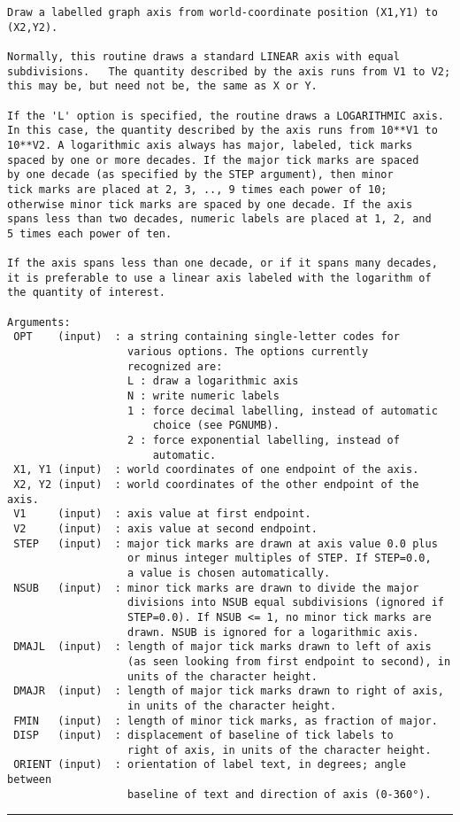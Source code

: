 {\begin{verbatim}
Draw a labelled graph axis from world-coordinate position (X1,Y1) to
(X2,Y2).

Normally, this routine draws a standard LINEAR axis with equal
subdivisions.   The quantity described by the axis runs from V1 to V2;
this may be, but need not be, the same as X or Y. 

If the 'L' option is specified, the routine draws a LOGARITHMIC axis.
In this case, the quantity described by the axis runs from 10**V1 to
10**V2. A logarithmic axis always has major, labeled, tick marks 
spaced by one or more decades. If the major tick marks are spaced
by one decade (as specified by the STEP argument), then minor
tick marks are placed at 2, 3, .., 9 times each power of 10;
otherwise minor tick marks are spaced by one decade. If the axis
spans less than two decades, numeric labels are placed at 1, 2, and
5 times each power of ten.

If the axis spans less than one decade, or if it spans many decades,
it is preferable to use a linear axis labeled with the logarithm of
the quantity of interest.

Arguments:
 OPT    (input)  : a string containing single-letter codes for
                   various options. The options currently
                   recognized are:
                   L : draw a logarithmic axis
                   N : write numeric labels
                   1 : force decimal labelling, instead of automatic
                       choice (see PGNUMB).
                   2 : force exponential labelling, instead of
                       automatic.
 X1, Y1 (input)  : world coordinates of one endpoint of the axis.
 X2, Y2 (input)  : world coordinates of the other endpoint of the axis.
 V1     (input)  : axis value at first endpoint.
 V2     (input)  : axis value at second endpoint.
 STEP   (input)  : major tick marks are drawn at axis value 0.0 plus
                   or minus integer multiples of STEP. If STEP=0.0,
                   a value is chosen automatically.
 NSUB   (input)  : minor tick marks are drawn to divide the major
                   divisions into NSUB equal subdivisions (ignored if
                   STEP=0.0). If NSUB <= 1, no minor tick marks are
                   drawn. NSUB is ignored for a logarithmic axis.
 DMAJL  (input)  : length of major tick marks drawn to left of axis
                   (as seen looking from first endpoint to second), in
                   units of the character height.
 DMAJR  (input)  : length of major tick marks drawn to right of axis,
                   in units of the character height.
 FMIN   (input)  : length of minor tick marks, as fraction of major.
 DISP   (input)  : displacement of baseline of tick labels to
                   right of axis, in units of the character height.
 ORIENT (input)  : orientation of label text, in degrees; angle between
                   baseline of text and direction of axis (0-360°).
\end{verbatim}
\hrule


}
